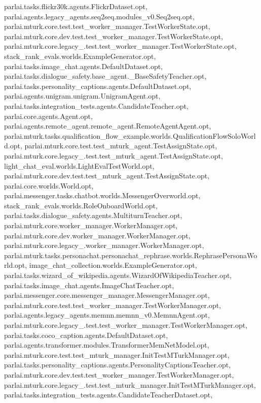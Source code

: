 parlai.\+tasks.\+flickr30k.\+agents.\+Flickr\+Dataset.\+opt, parlai.\+agents.\+legacy\+\_\+agents.\+seq2seq.\+modules\+\_\+v0.\+Seq2seq.\+opt, parlai.\+mturk.\+core.\+test.\+test\+\_\+worker\+\_\+manager.\+Test\+Worker\+State.\+opt, parlai.\+mturk.\+core.\+dev.\+test.\+test\+\_\+worker\+\_\+manager.\+Test\+Worker\+State.\+opt, parlai.\+mturk.\+core.\+legacy\+\_.\+test.\+test\+\_\+worker\+\_\+manager.\+Test\+Worker\+State.\+opt, stack\+\_\+rank\+\_\+evals.\+worlds.\+Example\+Generator.\+opt, parlai.\+tasks.\+image\+\_\+chat.\+agents.\+Default\+Dataset.\+opt, parlai.\+tasks.\+dialogue\+\_\+safety.\+base\+\_\+agent.\+\_\+\+Base\+Safety\+Teacher.\+opt, parlai.\+tasks.\+personality\+\_\+captions.\+agents.\+Default\+Dataset.\+opt, parlai.\+agents.\+unigram.\+unigram.\+Unigram\+Agent.\+opt, parlai.\+tasks.\+integration\+\_\+tests.\+agents.\+Candidate\+Teacher.\+opt, parlai.\+core.\+agents.\+Agent.\+opt, parlai.\+agents.\+remote\+\_\+agent.\+remote\+\_\+agent.\+Remote\+Agent\+Agent.\+opt, parlai.\+mturk.\+tasks.\+qualification\+\_\+flow\+\_\+example.\+worlds.\+Qualification\+Flow\+Solo\+World.\+opt, parlai.\+mturk.\+core.\+test.\+test\+\_\+mturk\+\_\+agent.\+Test\+Assign\+State.\+opt, parlai.\+mturk.\+core.\+legacy\+\_.\+test.\+test\+\_\+mturk\+\_\+agent.\+Test\+Assign\+State.\+opt, light\+\_\+chat\+\_\+eval.\+worlds.\+Light\+Eval\+Test\+World.\+opt, parlai.\+mturk.\+core.\+dev.\+test.\+test\+\_\+mturk\+\_\+agent.\+Test\+Assign\+State.\+opt, parlai.\+core.\+worlds.\+World.\+opt, parlai.\+messenger.\+tasks.\+chatbot.\+worlds.\+Messenger\+Overworld.\+opt, stack\+\_\+rank\+\_\+evals.\+worlds.\+Role\+Onboard\+World.\+opt, parlai.\+tasks.\+dialogue\+\_\+safety.\+agents.\+Multiturn\+Teacher.\+opt, parlai.\+mturk.\+core.\+worker\+\_\+manager.\+Worker\+Manager.\+opt, parlai.\+mturk.\+core.\+dev.\+worker\+\_\+manager.\+Worker\+Manager.\+opt, parlai.\+mturk.\+core.\+legacy\+\_.\+worker\+\_\+manager.\+Worker\+Manager.\+opt, parlai.\+mturk.\+tasks.\+personachat.\+personachat\+\_\+rephrase.\+worlds.\+Rephrase\+Persona\+World.\+opt, image\+\_\+chat\+\_\+collection.\+worlds.\+Example\+Generator.\+opt, parlai.\+tasks.\+wizard\+\_\+of\+\_\+wikipedia.\+agents.\+Wizard\+Of\+Wikipedia\+Teacher.\+opt, parlai.\+tasks.\+image\+\_\+chat.\+agents.\+Image\+Chat\+Teacher.\+opt, parlai.\+messenger.\+core.\+messenger\+\_\+manager.\+Messenger\+Manager.\+opt, parlai.\+mturk.\+core.\+test.\+test\+\_\+worker\+\_\+manager.\+Test\+Worker\+Manager.\+opt, parlai.\+agents.\+legacy\+\_\+agents.\+memnn.\+memnn\+\_\+v0.\+Memnn\+Agent.\+opt, parlai.\+mturk.\+core.\+legacy\+\_.\+test.\+test\+\_\+worker\+\_\+manager.\+Test\+Worker\+Manager.\+opt, parlai.\+tasks.\+coco\+\_\+caption.\+agents.\+Default\+Dataset.\+opt, parlai.\+agents.\+transformer.\+modules.\+Transformer\+Mem\+Net\+Model.\+opt, parlai.\+mturk.\+core.\+test.\+test\+\_\+mturk\+\_\+manager.\+Init\+Test\+M\+Turk\+Manager.\+opt, parlai.\+tasks.\+personality\+\_\+captions.\+agents.\+Personality\+Captions\+Teacher.\+opt, parlai.\+mturk.\+core.\+dev.\+test.\+test\+\_\+worker\+\_\+manager.\+Test\+Worker\+Manager.\+opt, parlai.\+mturk.\+core.\+legacy\+\_.\+test.\+test\+\_\+mturk\+\_\+manager.\+Init\+Test\+M\+Turk\+Manager.\+opt, parlai.\+tasks.\+integration\+\_\+tests.\+agents.\+Candidate\+Teacher\+Dataset.\+opt, 